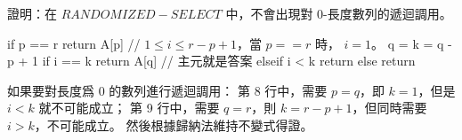 \startEXERCISE
證明：在 $RANDOMIZED-SELECT$ 中，不會出現對 0-長度數列的遞迴調用。

\startCLRSCODE
if p == r
	return A[p]	// $1\le i \le r-p+1$，當 $p==r$ 時， $i=1$。
q = 
k = q - p + 1
if i == k
	return A[q]	// 主元就是答案
elseif i < k
	return 
else
	return 
\stopCLRSCODE
\stopEXERCISE

\startANSWER
如果要對長度爲 0 的數列進行遞迴調用：
\startigNum
\startitem
第 8 行中，需要 $p=q$，即 $k=1$，但是 $i<k$ 就不可能成立；
\stopitem
\startitem
第 9 行中，需要 $q=r$，則 $k=r-p+1$，但同時需要 $i>k$，不可能成立。
\stopitem
\stopigNum
然後根據歸納法維持不變式得證。
\stopANSWER
